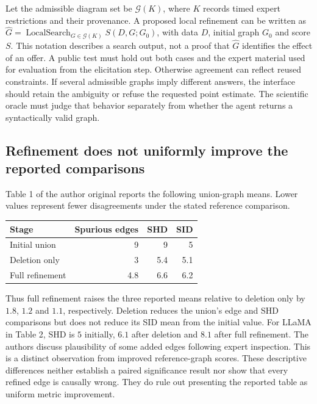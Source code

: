 Let the admissible diagram set be $\mathcal{G}(K)$, where $K$ records timed
expert restrictions and their provenance. A proposed local refinement can be
written as $\widehat G=\operatorname{LocalSearch}_{G\in\mathcal{G}(K)}
S(D,G;G_0)$, with data $D$, initial graph $G_0$ and score $S$. This notation
describes a search output, not a proof that $\widehat G$ identifies the effect
of an offer. A public test must hold out both cases and the expert material used
for evaluation from the elicitation step. Otherwise agreement can reflect
reused constraints. If several admissible graphs imply different answers, the
interface should retain the ambiguity or refuse the requested point estimate.
The scientific oracle must judge that behavior separately from whether the
agent returns a syntactically valid graph.~\citep{exec24_ecmo_reference}

\subsection{Refinement does not uniformly improve the reported comparisons}
Table 1 of the author original reports the following union-graph means. Lower
values represent fewer disagreements under the stated reference comparison.
\citep{exec24_ecmo_original}
\begin{center}
\begin{tabular}{lrrr}
\toprule
Stage & Spurious edges & SHD & SID \\
\midrule
Initial union & 9 & 9 & 5 \\
Deletion only & 3 & 5.4 & 5.1 \\
Full refinement & 4.8 & 6.6 & 6.2 \\
\bottomrule
\end{tabular}
\end{center}
Thus full refinement raises the three reported means relative to deletion only
by $1.8$, $1.2$ and $1.1$, respectively. Deletion reduces the union's edge and
SHD comparisons but does not reduce its SID mean from the initial value.
For LLaMA in Table 2, SHD is $5$ initially, $6.1$ after deletion and $8.1$
after full refinement. The authors discuss plausibility of some added edges
following expert inspection. This is a distinct observation from improved
reference-graph scores. These descriptive differences neither establish a
paired significance result nor show that every refined edge is causally wrong.
They do rule out presenting the reported table as uniform metric improvement.
\citep{exec24_ecmo_original,exec24_ecmo_reference}


